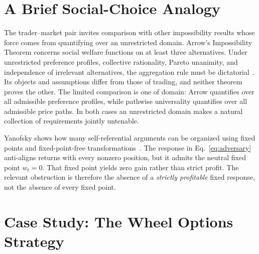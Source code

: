 \documentclass[aps,pra,reprint,superscriptaddress,amsmath,amssymb,floatfix]{revtex4-2}
\theoremstyle{plain}
\theoremstyle{definition}
\theoremstyle{remark}
\begin{document}
\section{A Brief Social-Choice Analogy}
\label{sec:arrow}

The trader--market pair invites comparison with other impossibility results
whose force comes from quantifying over an unrestricted domain.
Arrow's Impossibility Theorem concerns social welfare functions on at least
three alternatives. Under unrestricted preference profiles, collective
rationality, Pareto unanimity, and independence of irrelevant alternatives,
the aggregation rule must be dictatorial~\cite{Arrow1963}. Its objects and
assumptions differ from those of trading, and neither theorem proves the
other. The limited comparison is one of domain: Arrow quantifies over all
admissible preference profiles, while pathwise universality quantifies over
all admissible price paths. In both cases an unrestricted domain makes a
natural collection of requirements jointly untenable.

Yanofsky shows how many self-referential arguments can be organized using
fixed points and fixed-point-free transformations~\cite{Yanofsky-BSL:9051621}.
The response in Eq.~\eqref{eq:adversary} anti-aligns returns with every
nonzero position, but it admits the neutral fixed point \(w_t=0\). That fixed
point yields zero gain rather than strict profit. The relevant obstruction is
therefore the absence of a \emph{strictly profitable} fixed response, not the
absence of every fixed point.

\section{Case Study: The Wheel Options Strategy}
\label{sec:wheel}
\end{document}

